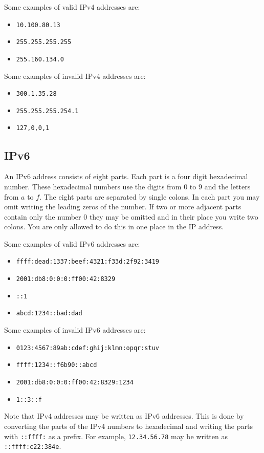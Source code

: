 Some examples of valid IPv4 addresses are:
\begin{itemize}
	\item \texttt{10.100.80.13}
	\item \texttt{255.255.255.255}
	\item \texttt{255.160.134.0}
\end{itemize}

Some examples of invalid IPv4 addresses are:
\begin{itemize}
	\item \texttt{300.1.35.28}
	\item \texttt{255.255.255.254.1}
	\item \texttt{127,0,0,1}
\end{itemize}

\subsection*{IPv6}
An IPv6 address consists of eight parts.
Each part is a four digit hexadecimal number.
These hexadecimal numbers use the digits from $0$ to $9$ and the letters from $a$ to $f$.
The eight parts are separated by single colons.
In each part you may omit writing the leading zeros of the number.
If two or more adjacent parts contain only the number $0$ they may be omitted and in their place you write two colons.
You are only allowed to do this in one place in the IP address.

Some examples of valid IPv6 addresses are:
\begin{itemize}
	\item \texttt{ffff:dead:1337:beef:4321:f33d:2f92:3419}
	\item \texttt{2001:db8:0:0:0:ff00:42:8329}
	\item \texttt{::1}
    \item \texttt{abcd:1234::bad:dad}
\end{itemize}

Some examples of invalid IPv6 addresses are:
\begin{itemize}
	\item \texttt{0123:4567:89ab:cdef:ghij:klmn:opqr:stuv}
	\item \texttt{ffff:1234::f6b90::abcd}
	\item \texttt{2001:db8:0:0:0:ff00:42:8329:1234}
    \item \texttt{1::3::f}
\end{itemize}

Note that IPv4 addresses may be written as IPv6 addresses.
This is done by converting the parts of the IPv4 numbers to hexadecimal
and writing the parts with \texttt{::ffff:} as a prefix.
For example, \texttt{12.34.56.78} may be written as \texttt{::ffff:c22:384e}.

